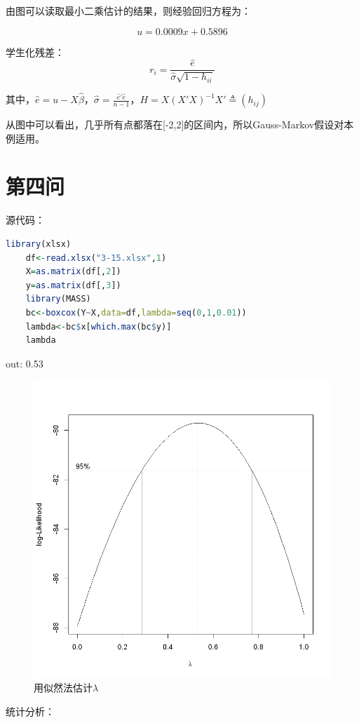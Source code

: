 \documentclass[a4paper,12pt]{article}
\begin{document}
由图可以读取最小二乘估计的结果，则经验回归方程为：

$$u=0.0009x+0.5896$$

学生化残差：$$r_i=\frac{\hat{e}}{\hat{\sigma}\sqrt{1-h_{ii}}}$$

其中，$\hat{e}=u-X\hat{\beta}$，$\hat{\sigma}=\frac{\hat{e}'\hat{e}}{n-1}$，$H=X(X'X)^{-1}X'\triangleq (h_{ij})$

从图中可以看出，几乎所有点都落在[-2,2]的区间内，所以Gauss-Markov假设对本例适用。

\section{第四问}

源代码：

\begin{lstlisting}[language=r,breaklines]
	library(xlsx)
	df<-read.xlsx("3-15.xlsx",1)
	X=as.matrix(df[,2])
	y=as.matrix(df[,3])
	library(MASS)
	bc<-boxcox(Y~X,data=df,lambda=seq(0,1,0.01))
	lambda<-bc$x[which.max(bc$y)]
	lambda
\end{lstlisting}

out: 0.53
\begin{figure}[htbp]
	\centering
	\includegraphics[scale=0.4]{out6.png}
	\caption{用似然法估计$\lambda$}
\end{figure}
统计分析：
\end{document}
